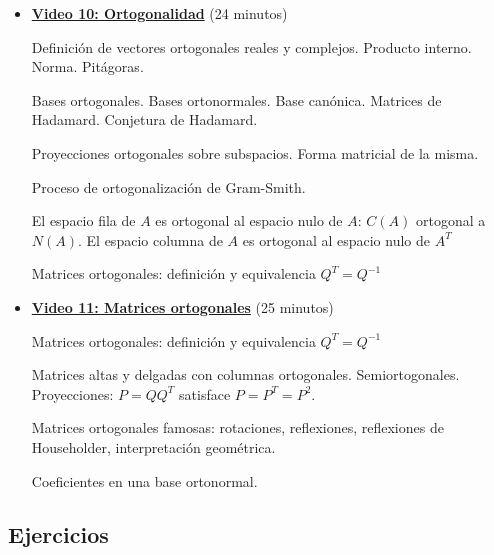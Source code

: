 \documentclass[12pt,a4paper]{article}
\newcommand\1{\mbox{\,\vrule height-0.8pt depth1.0pt width2pc\,}}
\newcommand\2{\mbox{\,\vrule height-0.8pt depth1.0pt width1pc\,}}
\begin{document}
\begin{itemize}
    \item \href{https://youtu.be/TsGFpKJCimk}{\bf Video 10: Ortogonalidad} (24 minutos)
    
    
    Definici\'on de vectores ortogonales reales y complejos. Producto interno. Norma. Pit\'agoras. 
    
    Bases ortogonales. Bases ortonormales. Base can\'onica. Matrices de Hadamard. Conjetura de Hadamard.
    
    Proyecciones ortogonales sobre subspacios. Forma matricial de la misma. 
    
    Proceso de ortogonalizaci\'on de Gram-Smith.
    
    El espacio fila de $A$ es ortogonal al espacio nulo de $A$: $C(A)$ ortogonal a $N(A)$. El espacio columna de $A$ es ortogonal al espacio nulo de $A^T $
    
    Matrices ortogonales: definici\'on y equivalencia $Q^T=Q^{-1}$
    
    
    \item \href{https://youtu.be/pMY5LI-1c-Q}{\bf Video 11: Matrices ortogonales} (25 minutos)
    
    Matrices ortogonales: definici\'on y equivalencia $Q^T=Q^{-1}$
    
    Matrices altas y delgadas con columnas ortogonales. Semiortogonales. Proyecciones: $P=QQ^T$ satisface $P=P^T=P^2$.  
    
    Matrices ortogonales famosas: rotaciones, reflexiones, reflexiones de Householder, interpretaci\'on geom\'etrica. 
    
    Coeficientes en una base ortonormal.
\end{itemize}


\subsection*{Ejercicios}
\end{document}
